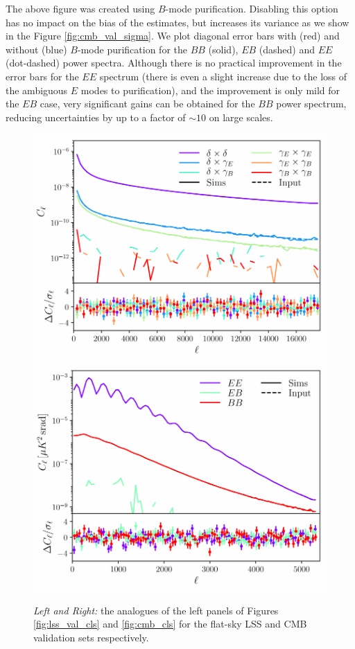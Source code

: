 \documentclass[usenatbib]{mnrasb}
\begin{document}
      The above figure was created using $B$-mode purification. Disabling this option has no impact on the bias of the estimates, but increases its variance as we show in the Figure \ref{fig:cmb_val_sigma}. We plot diagonal error bars with (red) and without (blue) $B$-mode purification for the $BB$ (solid), $EB$ (dashed) and $EE$ (dot-dashed) power spectra. Although there is no practical improvement in the error bars for the $EE$ spectrum (there is even a slight increase due to the loss of the ambiguous $E$ modes to purification), and the improvement is only mild for the $EB$ case, very significant gains can be obtained for the $BB$ power spectrum, reducing uncertainties by up to a factor of $\sim10$ on large scales.
      \begin{figure}
        \centering
        \includegraphics[width=0.99\columnwidth]{val_cl_lss_flat}
        \includegraphics[width=0.99\columnwidth]{val_cl_cmb_flat}
        \caption{{\sl Left and Right:} the analogues of the left panels of Figures \ref{fig:lss_val_cls} and \ref{fig:cmb_cls} for the flat-sky LSS and CMB validation sets respectively.} \label{fig:val_cls_flat}
      \end{figure}
      
\end{document}
